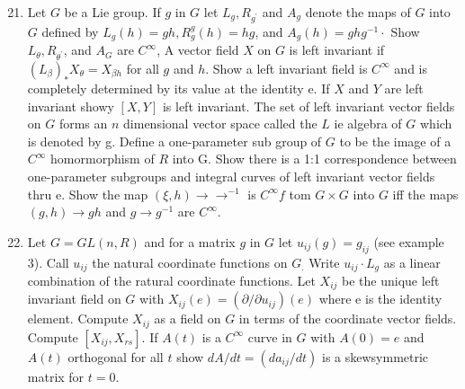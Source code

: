 \documentclass[10pt]{article}
\begin{document}
\begin{enumerate}
  \setcounter{enumi}{20}
  \item Let $G$ be a Lie group. If $g$ in $G$ let $L_{g}, R_{g^{\prime}}$ and $A_{g}$ denote the maps of $G$ into $G$ defined by $L_{g}(h)=g h, R_{g}^{g}(h)=h g$, and $A_{g}(h)=g h g^{-1} \cdot$ Show $L_{\theta}, R_{\theta^{\prime}}$, and $A_{G}$ are $C^{\infty}$, A vector field $X$ on $G$ is left invariant if $\left(L_{\beta}\right)_{*} X_{\theta}=X_{\beta h}$ for all $g$ and $h$. Show a left invariant field is $C^{\infty}$ and is completely determined by its value at the identity e. If $X$ and $Y$ are left invariant showy $[X, Y]$ is left invariant. The set of left invariant vector fields on $G$ forms an $n$ dimensional vector space called the $L$ ie algebra of $G$ which is denoted by g. Define a one-parameter sub group of $G$ to be the image of a $C^{\infty}$ homormorphism of $R$ into G. Show there is a 1:1 correspondence between one-parameter subgroups and integral curves of left invariant vector fields thru e. Show the map $(\xi, h) \rightarrow \rightarrow^{-1}$ is $C^{\infty} f$ tom $G \times G$ into $G$ iff the maps $(g, h) \rightarrow g h$ and $g \rightarrow g^{-1}$ are $C^{\infty}$.

  \item Let $G=G L(n, R)$ and for a matrix $g$ in $G$ let $u_{i j}(g)=g_{i j}$ (see example 3). Call $u_{i j}$ the natural coordinate functions on $G_{.}$ Write $u_{i j} \cdot L_{g}$ as a linear combination of the ratural coordinate functions. Let $X_{i j}$ be the unique left invariant field on $G$ with $X_{i j}(e)=\left(\partial / \partial u_{i j}\right)(e)$ where e is the identity element. Compute $X_{i j}$ as a field on $G$ in terms of the coordinate vector fields. Compute $\left[X_{i j}, X_{r s}\right]$. If $A(t)$ is a $C^{\infty}$ curve in $G$ with $A(0)=e$ and $A(t)$ orthogonal for all $t$ show $d A / d t=\left(d a_{i j} / d t\right)$ is a skewsymmetric matrix for $t=0$.


\end{enumerate}
\end{document}
